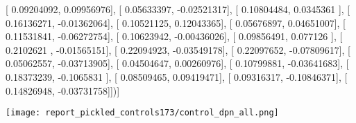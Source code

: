 \documentclass{article}
\begin{document}
       [ 0.09204092,  0.09956976],
       [ 0.05633397, -0.02521317],
       [ 0.10804484,  0.0345361 ],
       [ 0.16136271, -0.01362064],
       [ 0.10521125,  0.12043365],
       [ 0.05676897,  0.04651007],
       [ 0.11531841, -0.06272754],
       [ 0.10623942, -0.00436026],
       [ 0.09856491,  0.077126  ],
       [ 0.2102621 , -0.01565151],
       [ 0.22094923, -0.03549178],
       [ 0.22097652, -0.07809617],
       [ 0.05062557, -0.03713905],
       [ 0.04504647,  0.00260976],
       [ 0.10799881, -0.03641683],
       [ 0.18373239, -0.1065831 ],
       [ 0.08509465,  0.09419471],
       [ 0.09316317, -0.10846371],
       [ 0.14826948, -0.03731758]])]
\begin{center}
\texttt{[image: report\_pickled\_controls173/control\_dpn\_all.png]}

\end{center}
\end{document}
